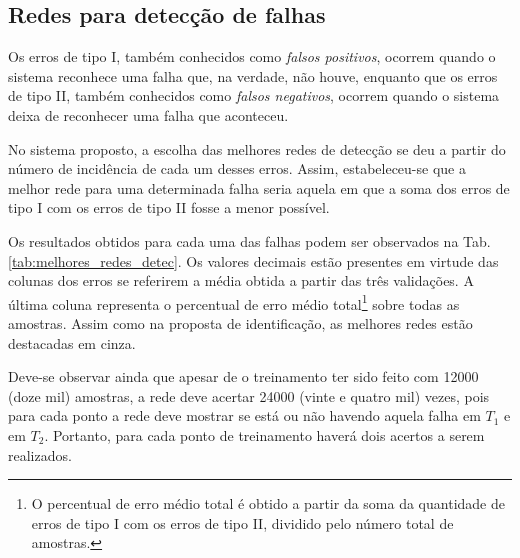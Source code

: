 \subsection{Redes para detecção de falhas}
Os erros de tipo I, também conhecidos como {\it falsos positivos}, ocorrem
quando o sistema reconhece uma falha que, na verdade, não houve, enquanto que os
erros de tipo II, também conhecidos como {\it falsos negativos}, ocorrem quando
o sistema deixa de reconhecer uma falha que aconteceu.

No sistema proposto, a escolha das melhores redes de detecção se deu a partir do
número de incidência de cada um desses erros. Assim, estabeleceu-se que a melhor
rede para uma determinada falha seria aquela em que a soma dos erros de tipo I
com os erros de tipo II fosse a menor possível.

Os resultados obtidos para cada uma das falhas podem ser observados na Tab.
\ref{tab:melhores_redes_detec}. Os valores decimais estão presentes em virtude
das colunas dos erros se referirem a média obtida a partir das três validações.
A última coluna representa o percentual de erro médio total\footnote{O
percentual de erro médio total é obtido a partir da soma da quantidade de erros
de tipo I com os erros de tipo II, dividido pelo número total de amostras.}
sobre todas as amostras.  Assim como na proposta de identificação, as melhores
redes estão destacadas em cinza.

Deve-se observar ainda que apesar de o treinamento ter sido feito com 12000
(doze mil) amostras, a rede deve acertar 24000 (vinte e quatro mil) vezes, pois
para cada ponto a rede deve mostrar se está ou não havendo aquela falha em $T_1$
e em $T_2$. Portanto, para cada ponto de treinamento haverá dois acertos a serem
realizados. 

